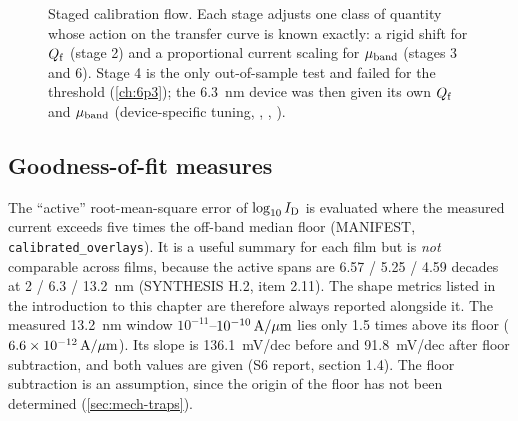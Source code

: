 \begin{figure}[tbp]
\centering
{}
\caption{Staged calibration flow. Each stage adjusts one class of quantity whose action on the transfer curve is known exactly: a rigid shift for $Q_{\mathrm{f}}$ (stage 2) and a proportional current scaling for $\mu_{\mathrm{band}}$ (stages 3 and 6). Stage 4 is the only out-of-sample test and failed for the threshold (\cref{ch:6p3}); the 6.3~nm device was then given its own $Q_{\mathrm{f}}$ and $\mu_{\mathrm{band}}$ (device-specific tuning, , , ).}
\label{fig:cal-workflow}
\end{figure}

\subsection{Goodness-of-fit measures}\label{sec:cal-gof}
The ``active'' root-mean-square error of $\log_{10}I_{\mathrm{D}}$ is evaluated where the measured current exceeds five times the off-band median floor (MANIFEST, \texttt{calibrated\_overlays}). It is a useful summary for each film but is \emph{not} comparable across films, because the active spans are 6.57 / 5.25 / 4.59 decades at 2 / 6.3 / 13.2~nm (SYNTHESIS H.2, item 2.11). The shape metrics listed in the introduction to this chapter are therefore always reported alongside it. The measured 13.2~nm window $10^{-11}$--$10^{-10}\,\mathrm{A}/\mu\mathrm{m}$ lies only 1.5 times above its floor ($6.6\times10^{-12}\,\mathrm{A}/\mu\mathrm{m}$). Its slope is 136.1~mV/dec before and 91.8~mV/dec after floor subtraction, and both values are given (S6 report, section 1.4). The floor subtraction is an assumption, since the origin of the floor has not been determined (\cref{sec:mech-traps}).

